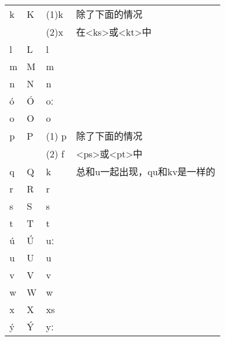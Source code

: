 \begin{longtable}{llll}
  k        & K        & (1)k             & 除了下面的情况                                           \\
           &          & (2)x             & 在\textless ks\textgreater 或\textless kt\textgreater 中 \\
  l        & L        & l                &                                                          \\
  m        & M        & m                &                                                          \\
  n        & N        & n                &                                                          \\
  ó        & Ó        & oː               &                                                          \\
  o        & O        & o                &                                                          \\
  p        & P        & (1) p            & 除了下面的情况                                           \\
           &          & (2) f            & \textless ps\textgreater 或\textless pt\textgreater 中   \\
  q        & Q        & k                & 总和u一起出现，qu和kv是一样的                            \\
  r        & R        & r                &                                                          \\
  s        & S        & s                &                                                          \\
  t        & T        & t                &                                                          \\
  ú        & Ú        & uː               &                                                          \\
  u        & U        & u                &                                                          \\
  v        & V        & v                &                                                          \\
  w        & W        & w                &                                                          \\
  x        & X        & xs               &                                                          \\
  ý        & Ý        & yː               &                                                          \\

\end{longtable}
